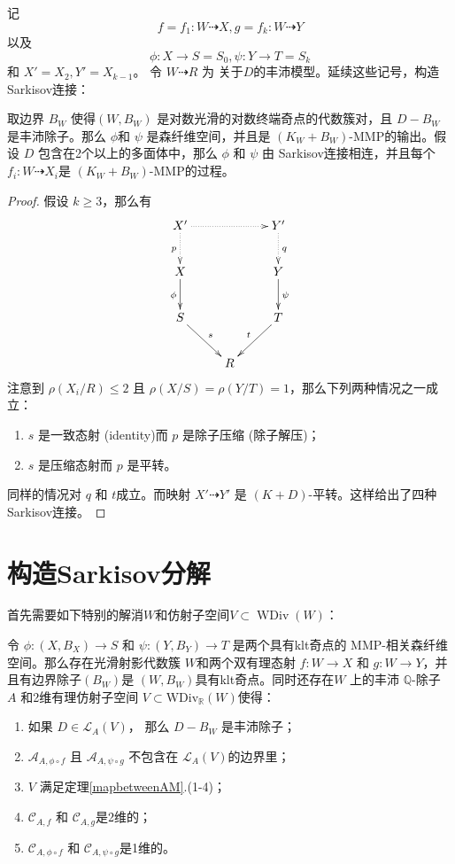 记 
\[ f=f_1:W\dashrightarrow X, g=f_k:W\dashrightarrow Y \]
以及 
\[ \phi:X\to S=S_0,\psi:Y\to T=S_k \]
和 $ X'=X_2,Y'=X_{k-1}$。 令 $ W\dashrightarrow R $ 为 关于$ D $的丰沛模型。延续这些记号，构造Sarkisov连接：
\begin{theorem}\label{constructlink}
  \cite[Theorem 3.7]{haconSarkisovProgram2012} 取边界 $ B_W $ 使得$ (W,B_W) $ 是对数光滑的对数终端奇点的代数簇对，且 $ D-B_W $ 是丰沛除子。那么 $ \phi $和 $ \psi $ 是森纤维空间，并且是 $ (K_W+B_W) $-MMP的输出。假设 $ D $ 包含在2个以上的多面体中，那么 $\phi$ 和 $\psi$ 由 Sarkisov连接相连，并且每个 $f_{i}:W \dashrightarrow  X_{i}$是  $(K_{W}+B_{W})$-MMP的过程。
\end{theorem}
\begin{proof}
  假设 $ k\geqslant 3 $，那么有
  \[ \xymatrix{
      X'\ar@{.>}[d]_p\ar@{.>}[rr]&&Y'\ar@{.>}[d]^q\\
      X\ar[d]_{\phi}&&Y\ar[d]^\psi\\
      S\ar[rd]^s&&T\ar[ld]_t\\
      &R&} \]
  注意到 $ \rho(X_i/R)\leqslant 2 $ 且 $ \rho(X/S)=\rho(Y/T)=1 $，那么下列两种情况之一成立：
  \begin{enumerate}
    \item $ s $ 是一致态射 (identity)而 $ p $ 是除子压缩 (除子解压)；
    \item $ s $ 是压缩态射而 $ p $ 是平转。
  \end{enumerate}
  同样的情况对 $ q $ 和 $ t $成立。而映射 $X'\dashrightarrow Y'$ 是 $(K+D)$-平转。这样给出了四种Sarkisov连接。 \end{proof}

\section{构造Sarkisov分解}
首先需要如下特别的解消$W$和仿射子空间$V \subset \operatorname{WDiv}(W)$：

\begin{lemma}\label{keylemma}
  \cite[Lemma 4.1]{haconSarkisovProgram2012} 令 $ \phi: (X,B_{X}) \to S $ 和 $ \psi: (Y,B_{Y})\to T  $ 是两个具有klt奇点的 MMP-相关森纤维空间。那么存在光滑射影代数簇 $ W $和两个双有理态射 $ f:W\to X $  和 $ g:W\to Y $，并且有边界除子$(B_{W})$是 $ (W,B_{W}) $具有klt奇点。同时还存在$W$ 上的丰沛 $ \mathbb{Q} $-除子 $ A $ 和2维有理仿射子空间 $ V \subset \mathrm{WDiv}_{\mathbb{R}}(W) $使得：
  \begin{enumerate}
    \item 如果 $ D\in \mathcal{L}_A(V) $， 那么 $ D-B_W $ 是丰沛除子；
    \item $ \mathcal{A}_{A,\phi\circ f} $ 且 $ \mathcal{A}_{A,\psi\circ g} $ 不包含在 $ \mathcal{L}_A(V) $的边界里；
    \item $ V $ 满足定理\ref{mapbetweenAM}.(1-4)；
    \item $ \mathcal{C}_{A,f} $ 和 $ \mathcal{C}_{A,g} $是2维的； 
    \item $ \mathcal{C}_{A,\phi\circ f} $ 和 $ \mathcal{C}_{A,\psi\circ g} $是1维的。 
  \end{enumerate}
\end{lemma}

